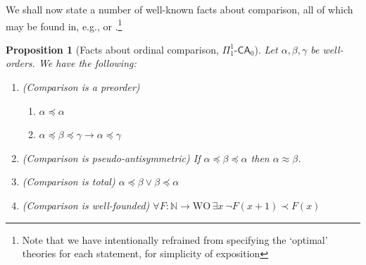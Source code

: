 \documentclass[10pt,a4paper]{amsart}
\theoremstyle{plain}
\newtheorem{proposition}[proposition]{Proposition}
\theoremstyle{definition}
\newcommand{\conprec}{\rotatebox[origin=c]{180}{$\prec$}} %
\newcommand{\anupam}[1]{\todo[color=green]{A: #1}}
\renewcommand{\todo}[1]{}
\renewcommand{\anupam}[1]{}
\theoremstyle{plain}
\theoremstyle{definition} %
\renewcommand{\succ}{\mathsf s}
\newcommand{\Nat}{\mathbb{N}}
\renewcommand{\lor}{\vee}
\newcommand{\limp}{\to}
\newcommand{\liff}{\leftrightarrow}
\newcommand{\Sin}[2]{\Sigma^{#1}_{#2}}
\newcommand{\Pin}[2]{\Pi^{#1}_{#2}}
\newcommand{\CA}{\mathsf{CA}}
\newcommand{\ca}[1]{#1\text{-}\CA}
\newcommand{\PCA}{\ca{\Pin 11}_0}
\newcommand{\ATR}{\mathsf{ATR}}
\newcommand{\WO}{\mathrm{WO}}
\newcommand{\ordleq}{\preceq}
\newcommand{\ordlneq}{\prec}
\newcommand{\ordgeq}{\succeq}
\newcommand{\ordgneq}{\conprec}
\newcommand{\ordeq}{\approx}
\begin{document}

We shall now state a number of well-known facts about comparison, all of which may be found in, e.g., \cite{Simpson99:monograph} or \cite{hirst05:ord-arith-rm-survey}.\footnote{Note that we have intentionally refrained from specifying the `optimal' theories for each statement, for simplicity of exposition}

\begin{proposition}
    [Facts about ordinal comparison, $\PCA$]
    \label{prop:ord-comparison-facts}
    Let $\alpha,\beta,\gamma$ be well-orders.
    We have the following:
    \begin{enumerate}
        \item\label{item:comparison-is-preorder} (Comparison is a preorder)
\begin{enumerate}
    \item $\alpha\ordleq \alpha$
    \item $\alpha \ordleq \beta \ordleq \gamma \limp \alpha \ordleq \gamma$
\end{enumerate}
\item\label{item:comparison-pseudo-antisymmetric} (Comparison is pseudo-antisymmetric) If $\alpha \ordleq \beta \ordleq \alpha $ then $\alpha \ordeq \beta$.
\item\label{item:comparison-total} (Comparison is total) 
$\alpha \ordleq \beta \lor \beta \ordleq \alpha$
\item\label{item:comparison-wf} (Comparison is well-founded)
$\forall F: \Nat\to \WO \,  \exists x\  \lnot F(x+1)\ordlneq F(x)$
    \end{enumerate}
\end{proposition}


\anupam{commented ordinal arithmetic proposition below.}
\end{document}
